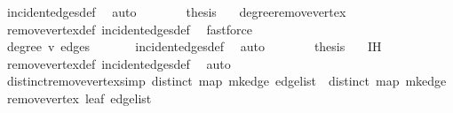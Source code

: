 \begin{isabellebody}
\ incident{\isacharunderscore}{\kern0pt}edges{\isacharunderscore}{\kern0pt}def\ \isamarkupfalse%
\ auto\isanewline
\ \ \ \ \isamarkupfalse%
\ \isamarkupfalse%
\ {\isacharquery}{\kern0pt}thesis\ \isamarkupfalse%
\ {}\ degree{\isacharunderscore}{\kern0pt}{}{\isacharunderscore}{\kern0pt}remove{\isacharunderscore}{\kern0pt}vertex\ \isamarkupfalse%
\ remove{\isacharunderscore}{\kern0pt}vertex{\isacharunderscore}{\kern0pt}def\ incident{\isacharunderscore}{\kern0pt}edges{\isacharunderscore}{\kern0pt}def\ \isamarkupfalse%
\ fastforce\isanewline
\ \ \isamarkupfalse%
\isanewline
\ \ \ \ \isamarkupfalse%
\ {}\isanewline
\ \ \ \ \isamarkupfalse%
\ \isamarkupfalse%
\ {\isachardoublequoteopen}degree\ v\ edges\ {\isacharequal}{\kern0pt}\ {}{\isachardoublequoteclose}\ \isamarkupfalse%
\ {}{\isacharparenleft}{\kern0pt}{}{\isacharparenright}{\kern0pt}\ \isamarkupfalse%
\ incident{\isacharunderscore}{\kern0pt}edges{\isacharunderscore}{\kern0pt}def\ \isamarkupfalse%
\ auto\isanewline
\ \ \ \ \isamarkupfalse%
\ \isamarkupfalse%
\ {\isacharquery}{\kern0pt}thesis\ \isamarkupfalse%
\ {}\ {\isachardoublequoteopen}{}{\isachardot}{\kern0pt}IH{\isachardoublequoteclose}\ \isamarkupfalse%
\ remove{\isacharunderscore}{\kern0pt}vertex{\isacharunderscore}{\kern0pt}def\ incident{\isacharunderscore}{\kern0pt}edges{\isacharunderscore}{\kern0pt}def\ \isamarkupfalse%
\ auto\isanewline
\ \ \isamarkupfalse%
\isanewline
{}\isamarkupfalse%
%
\endisatagproof
{\isafoldproof}%
%
\isadelimproof
\isanewline
%
\endisadelimproof
\isanewline
{}\isamarkupfalse%
\ distinct{\isacharunderscore}{\kern0pt}remove{\isacharunderscore}{\kern0pt}vertex{\isacharbrackleft}{\kern0pt}simp{\isacharbrackright}{\kern0pt}{\isacharcolon}{\kern0pt}\ {\isachardoublequoteopen}distinct\ {\isacharparenleft}{\kern0pt}map\ mk{\isacharunderscore}{\kern0pt}edge\ edge{\isacharunderscore}{\kern0pt}list{\isacharparenright}{\kern0pt}\ {\isasymLongrightarrow}\ distinct\ {\isacharparenleft}{\kern0pt}map\ mk{\isacharunderscore}{\kern0pt}edge\ {\isacharparenleft}{\kern0pt}remove{\isacharunderscore}{\kern0pt}vertex\ leaf\ edge{\isacharunderscore}{\kern0pt}list{\isacharparenright}{\kern0pt}{\isacharparenright}{\kern0pt}{\isachardoublequoteclose}\isanewline

\end{isabellebody}

